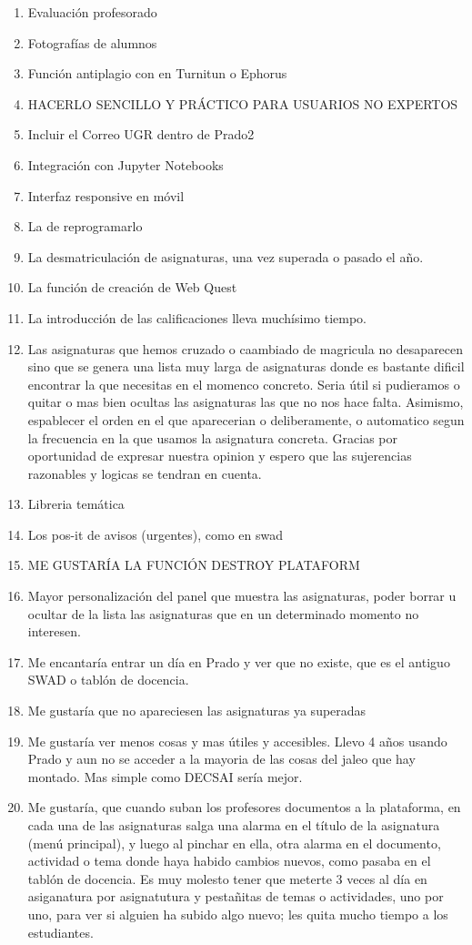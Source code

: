 \begin{enumerate}
\item Evaluación profesorado
\item Fotografías de alumnos
\item Función antiplagio con en Turnitun o Ephorus
\item HACERLO SENCILLO Y PRÁCTICO PARA USUARIOS NO EXPERTOS
\item Incluir el Correo UGR dentro de Prado2
\item Integración con Jupyter Notebooks
\item Interfaz responsive en móvil
\item La de reprogramarlo
\item La desmatriculación de asignaturas, una vez superada o pasado el año.
\item La función de creación de Web Quest
\item La introducción de las calificaciones lleva muchísimo tiempo.
\item Las asignaturas que hemos cruzado o caambiado de magricula no desaparecen sino que se genera una lista muy larga de asignaturas donde es bastante dificil encontrar la que necesitas en el momenco concreto. Seria útil si pudieramos o quitar o mas bien ocultas las asignaturas las que no nos hace falta. Asimismo, espablecer el orden en el que aparecerian o deliberamente, o automatico segun la frecuencia en la que usamos la asignatura concreta. Gracias por oportunidad de expresar nuestra opinion y espero que las sujerencias razonables y logicas se tendran en cuenta.
\item Libreria temática
\item Los pos-it de avisos (urgentes), como en swad
\item ME GUSTARÍA LA FUNCIÓN DESTROY PLATAFORM
\item Mayor personalización del panel que muestra las asignaturas, poder borrar u ocultar de la lista las asignaturas que en un determinado momento no interesen.
\item Me encantaría entrar un día en Prado y ver que no existe, que es el antiguo SWAD o tablón de docencia.
\item Me gustaría que no apareciesen las asignaturas ya superadas
\item Me gustaría ver menos cosas y mas útiles y accesibles. Llevo 4 años usando Prado y aun no se acceder a la mayoria de las cosas del jaleo que hay montado. Mas simple como DECSAI sería mejor.
\item Me gustaría, que cuando suban los profesores documentos a la plataforma, en cada una de las asignaturas salga una alarma en el título de la asignatura (menú principal), y luego al pinchar en ella, otra alarma en el documento, actividad o tema donde haya habido cambios nuevos, como pasaba en el tablón de docencia. Es muy molesto tener que meterte 3 veces al día en asiganatura por asignatutura y pestañitas de temas o actividades, uno por uno, para ver si alguien ha subido algo nuevo; les quita mucho tiempo a los estudiantes.

\end{enumerate}
